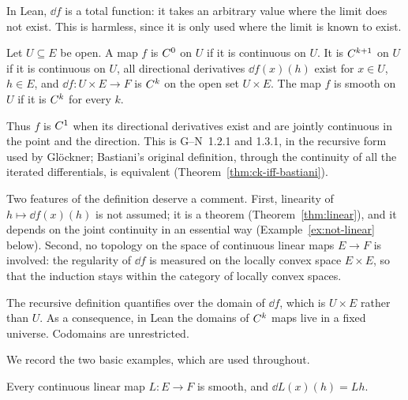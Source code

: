 \begin{remark}
  In Lean, $\dd f$ is a total function: it takes an arbitrary value where the limit does not
  exist. This is harmless, since it is only used where the limit is known to exist.
\end{remark}

\begin{definition}
  \label{def:ck}
  \leanok
  Let $U \subseteq E$ be open. A map $f$ is $C^{0}$ on $U$ if it is continuous on $U$. It is
  $C^{k+1}$ on $U$ if it is continuous on $U$, all directional derivatives $\dd f(x)(h)$ exist
  for $x \in U$, $h \in E$, and $\dd f \colon U \times E \to F$ is $C^{k}$ on the open set
  $U \times E$. The map $f$ is smooth on $U$ if it is $C^{k}$ for every $k$.
\end{definition}

Thus $f$ is $C^{1}$ when its directional derivatives exist and are jointly continuous in the
point and the direction. This is G--N~1.2.1 and 1.3.1, in the recursive form used by Glöckner;
Bastiani's original definition, through the continuity of all the iterated differentials, is
equivalent (Theorem~\ref{thm:ck-iff-bastiani}).

\begin{remark}
  Two features of the definition deserve a comment. First, linearity of $h \mapsto \dd f(x)(h)$
  is not assumed; it is a theorem (Theorem~\ref{thm:linear}), and it depends on the joint
  continuity in an essential way (Example~\ref{ex:not-linear} below). Second, no topology on
  the space of continuous linear maps $E \to F$ is involved: the regularity of $\dd f$ is
  measured on the locally convex space $E \times E$, so that the induction stays within the
  category of locally convex spaces.
\end{remark}

\begin{remark}
  The recursive definition quantifies over the domain of $\dd f$, which is $U \times E$ rather
  than $U$. As a consequence, in Lean the domains of $C^{k}$ maps live in a fixed universe.
  Codomains are unrestricted.
\end{remark}

We record the two basic examples, which are used throughout.

\begin{lemma}
  \label{lem:clm-smooth}
  \leanok
  Every continuous linear map $L \colon E \to F$ is smooth, and $\dd L(x)(h) = L h$.
\end{lemma}

